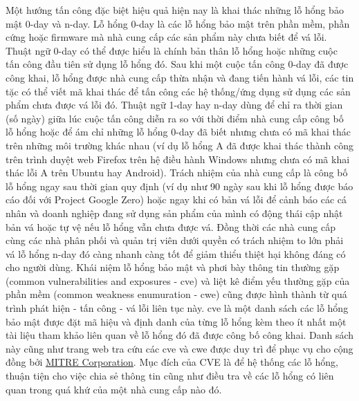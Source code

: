 Một hướng tấn công đặc biệt hiệu quả hiện nay là khai thác những lỗ hổng bảo mật 0-day và n-day. Lỗ hổng 0-day là các lỗ hổng bảo mật trên phần mềm, phần cứng hoặc firmware mà nhà cung cấp các sản phẩm này chưa biết để vá lỗi. Thuật ngữ 0-day có thể được hiểu là chính bản thân lỗ hổng hoặc những cuộc tấn công đầu tiên sử dụng lỗ hổng đó. Sau khi một cuộc tấn công 0-day đã được công khai, lỗ hổng được nhà cung cấp thừa nhận và đang tiến hành vá lỗi, các tin tặc có thể viết mã khai thác để tấn công các hệ thống/ứng dụng sử dụng các sản phẩm chưa được vá lỗi đó. Thuật ngữ 1-day hay n-day dùng để chỉ ra thời gian (số ngày) giữa lúc cuộc tấn công diễn ra so với thời điểm nhà cung cấp công bố lỗ hổng hoặc để ám chỉ những lỗ hổng 0-day đã biết nhưng chưa có mã khai thác trên những môi trường khác nhau (ví dụ lỗ hổng A đã được khai thác thành công trên trình duyệt web Firefox trên hệ điều hành Windows nhưng chưa có mã khai thác lỗi A trên Ubuntu hay Android). Trách nhiệm của nhà cung cấp là công bố lỗ hổng ngay sau thời gian quy định (ví dụ như 90 ngày sau khi lỗ hổng được báo cáo đối với Project Google Zero) hoặc ngay khi có bản vá lỗi để cảnh báo các cá nhân và doanh nghiệp đang sử dụng sản phẩm của mình có động thái cập nhật bản vá hoặc tự vệ nếu lỗ hổng vẫn chưa được vá. Đồng thời các nhà cung cấp cùng các nhà phân phối và quản trị viên dưới quyền có trách nhiệm to lớn phải vá lỗ hổng n-day đó càng nhanh càng tốt để giảm thiểu thiệt hại không đáng có cho người dùng. Khái niệm lỗ hổng bảo mật và phơi bày thông tin thường gặp (common vulnerabilities and exposures - \acrshort{cve}) và liệt kê điểm yếu thường gặp của phần mềm (common weakness enumuration - \acrshort{cwe}) cũng được hình thành từ quá trình phát hiện - tấn công - vá lỗi liên tục này. \acrshort{cve} là một danh sách các lỗ hổng bảo mật được đặt mã hiệu và định danh của từng lỗ hổng kèm theo ít nhất một tài liệu tham khảo liên quan về lỗ hổng đó đã được công bố công khai. Danh sách này cũng như trang web tra cứu các \acrshort{cve} \parencite{CVE-details} và \acrshort{cwe} \parencite{CWE-details} được duy trì để phục vụ cho cộng đồng bởi \href{http://cve.mitre.org/}{MITRE Corporation}. Mục đích của CVE là để hệ thống các lỗ hổng, thuận tiện cho việc chia sẻ thông tin cũng như điều tra về các lỗ hổng có liên quan trong quá khứ của một nhà cung cấp nào đó. \par
